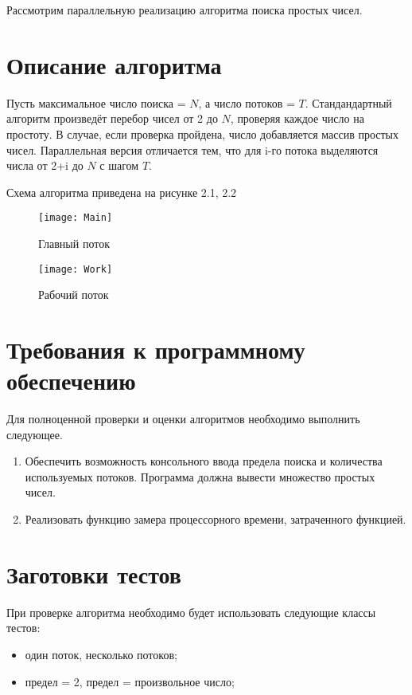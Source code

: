 Рассмотрим параллельную реализацию алгоритма поиска простых чисел.

\section{Описание алгоритма}
Пусть максимальное число поиска = $N$, а число потоков = $T$. Стандандартный алгоритм произведёт перебор чисел от 2 до $N$, проверяя каждое число на простоту. В случае, если проверка пройдена, число добавляется массив простых чисел. Параллельная версия отличается тем, что для i-го потока выделяются числа от 2+i до $N$ с шагом $T$.

Схема алгоритма приведена на рисунке 2.1, 2.2
\begin{figure}[h]
	\begin{center}
		{\texttt{[image: Main]}}
		\caption{Главный поток}
	\end{center}
\end{figure}
\begin{figure}[h]
	\begin{center}
		{\texttt{[image: Work]}}
		\caption{Рабочий поток}
	\end{center}
\end{figure}



\section{Требования к программному обеспечению}
Для полноценной проверки и оценки алгоритмов необходимо выполнить следующее.
\begin{enumerate}
	\item Обеспечить возможность консольного ввода предела поиска и количества используемых потоков. Программа должна вывести множество простых чисел.
	\item Реализовать функцию замера процессорного времени, затраченного функцией.
\end{enumerate}


\section{Заготовки тестов}
При проверке алгоритма необходимо будет использовать следующие классы тестов:
\begin{itemize}
	\item один поток, несколько потоков;
	\item предел = 2, предел = произвольное число;
\end{itemize}



